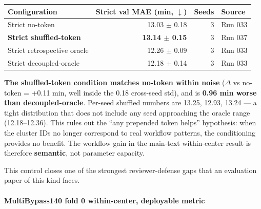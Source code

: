 \begin{longtable}[]{@{}lrrl@{}}
\toprule\noalign{}
Configuration & Strict val MAE (min, $\downarrow$) & Seeds & Source \\
\midrule\noalign{}
\endhead
\bottomrule\noalign{}
\endlastfoot
Strict no-token & 13.03 $\pm$ 0.18 & 3 & Run 033 \\
\textbf{Strict shuffled-token} & \textbf{13.14 $\pm$ 0.15} & 3 & Run 037 \\
Strict retrospective oracle & 12.26 $\pm$ 0.09 & 3 & Run 033 \\
Strict decoupled-oracle & 12.18 $\pm$ 0.14 & 3 & Run 033 \\
\end{longtable}

\textbf{The shuffled-token condition matches no-token within noise} ($\Delta$
vs no-token = +0.11 min, well inside the 0.18 cross-seed std), and is
\textbf{0.96 min worse than decoupled-oracle}. Per-seed shuffled numbers
are 13.25, 12.93, 13.24 --- a tight distribution that does not include
any seed approaching the oracle range (12.18--12.36). This rules out the
``any prepended token helps'' hypothesis: when the cluster IDs no longer
correspond to real workflow patterns, the conditioning provides no
benefit. The workflow gain in the main-text within-center result is therefore \textbf{semantic}, not
parameter capacity.

This control closes one of the strongest reviewer-defense gaps that an
evaluation paper of this kind faces.

\paragraph{MultiBypass140 fold 0 within-center, deployable
metric}\label{multibypass140-fold-0-within-center-deployable-metric}

